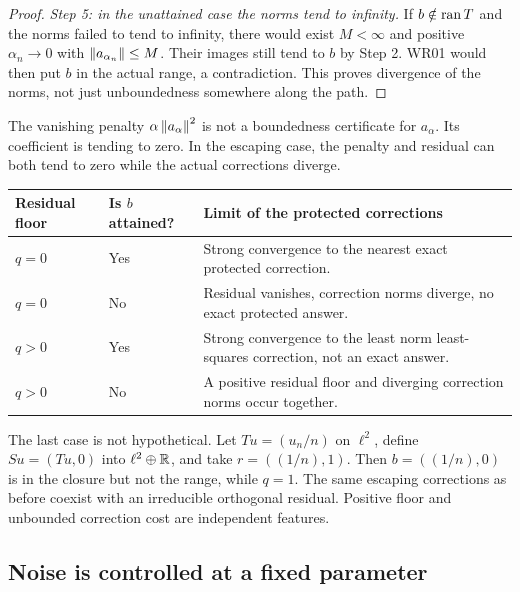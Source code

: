 \begin{proof}
\emph{Step 5: in the unattained case the norms tend to infinity.} If $b\notin\operatorname{ran} T$ and the norms failed to tend to infinity, there would exist $M<\infty$ and positive $\alpha_n\to0$ with $\left\lVert a_{\alpha_n}\right\rVert\le M$. Their images still tend to $b$ by Step 2. WR01 would then put $b$ in the actual range, a contradiction. This proves divergence of the norms, not just unboundedness somewhere along the path.
\end{proof}

The vanishing penalty $\alpha\left\lVert a_\alpha\right\rVert^2$ is not a boundedness certificate for $a_\alpha$. Its coefficient is tending to zero. In the escaping case, the penalty and residual can both tend to zero while the actual corrections diverge.

\begin{center}
\begin{tabularx}{\linewidth}{@{}p{.17\linewidth}p{.26\linewidth}X@{}}
\toprule Residual floor & Is $b$ attained? & Limit of the protected corrections\\\midrule
$q=0$ & Yes & Strong convergence to the nearest exact protected correction.\\[3pt]
$q=0$ & No & Residual vanishes, correction norms diverge, no exact protected answer.\\[3pt]
$q>0$ & Yes & Strong convergence to the least norm least-squares correction, not an exact answer.\\[3pt]
$q>0$ & No & A positive residual floor and diverging correction norms occur together.\\\bottomrule
\end{tabularx}
\end{center}

The last case is not hypothetical. Let $Tu=(u_n/n)$ on $\ell^2$, define $Su=(Tu,0)$ into $\ell^2\oplus\mathbb R$, and take $r=((1/n),1)$. Then $b=((1/n),0)$ is in the closure but not the range, while $q=1$. The same escaping corrections as before coexist with an irreducible orthogonal residual. Positive floor and unbounded correction cost are independent features.

\subsection{Noise is controlled at a fixed parameter}

